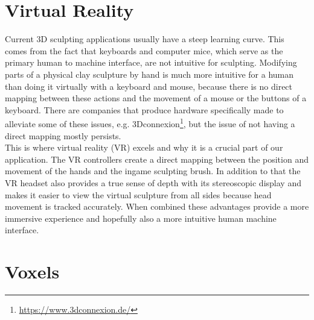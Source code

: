 \section{Virtual Reality}

Current 3D sculpting applications usually have a steep learning curve. This comes from the fact that keyboards and computer mice, which serve as the primary human to machine interface, are not intuitive for
sculpting. Modifying parts of a physical clay sculpture by hand is much more intuitive for a human than doing it virtually with a keyboard and mouse, because there is no direct mapping between these actions
and the movement of a mouse or the buttons of a keyboard. There are companies that produce hardware specifically made to alleviate some of these issues, e.g. 3Dconnexion\footnote{\url{https://www.3dconnexion.de/}}, but the issue
of not having a direct mapping mostly persists.\\
This is where virtual reality (VR) excels and why it is a crucial part of our application. The VR controllers create a direct mapping between the position and movement of the hands and the ingame sculpting brush. In addition to that
the VR headset also provides a true sense of depth with its stereoscopic display and makes it easier to view the virtual sculpture from all sides because head movement is tracked accurately. When combined these advantages provide
a more immersive experience and hopefully also a more intuitive human machine interface.



\section{Voxels}

